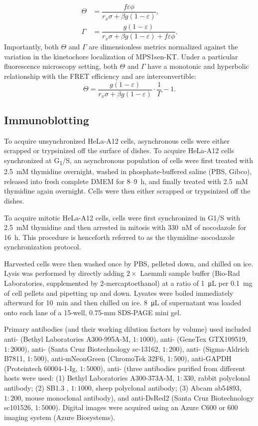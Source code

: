 \begin{align*}
    \Theta &= \dfrac{f\varepsilon\phi}{r_x\sigma + \beta g(1 - \varepsilon)},\\
    \Gamma &= \dfrac{g(1 - \varepsilon)}{r_x\sigma + \beta g(1 - \varepsilon) + f\varepsilon\phi}.
\end{align*}
Importantly, both $\Theta$ and $\Gamma$ are dimensionless metrics normalized against the variation in the kinetochore localization of MPS1sen-KT. Under a particular fluorescence microscopy setting, both $\Theta$ and $\Gamma$ have a monotonic and hyperbolic relationship with the FRET efficiency and are interconvertible:
\begin{equation*}
    \Theta = \dfrac{g(1 - \varepsilon)}{r_x\sigma + \beta g(1 - \varepsilon)}\cdot\dfrac{1}{\Gamma} - 1.
\end{equation*}

\subsection{Immunoblotting}
\label{WBMethods}
To acquire unsynchronized HeLa-A12 cells, asynchronous cells were either scrapped or trypsinized off the surface of dishes. To acquire HeLa-A12 cells synchronized at G\textsubscript{1}/S, an asynchronous population of cells were first treated with \SI{2.5}{mM} thymidine overnight, washed in phosphate-buffered saline (PBS, Gibco), released into fresh complete DMEM for 8--\SI{9}{h}, and finally treated with \SI{2.5}{mM} thymidine again overnight. Cells were then either scrapped or trypsinized off the dishes.

To acquire mitotic HeLa-A12 cells, cells were first synchronized in G1/S with \SI{2.5}{mM} thymidine and then arrested in mitosis with \SI{330}{nM} of nocodazole for \SI{16}{h}. This procedure is henceforth referred to as the thymidine--nocodazole synchronization protocol.

Harvested cells were then washed once by PBS, pelleted down, and chilled on ice. Lysis was performed by directly adding $2 \times$ Laemmli sample buffer (Bio-Rad Laboratories, supplemented by 2-mercaptoethanol) at a ratio of \SI{1}{\micro L} per \SI{0.1}{mg} of cell pellets and pipetting up and down. Lysates were boiled immediately afterward for \SI{10}{min} and then chilled on ice. \SI{8}{\micro L} of supernatant was loaded onto each lane of a 15-well, 0.75-mm SDS-PAGE mini gel.

Primary antibodies (and their working dilution factors by volume) used included anti- (Bethyl Laboratories A300-995A-M, $1 : 1000$), anti- (GeneTex GTX109519, $1 : 2000$), anti- (Santa Cruz Biotechnology sc-13162, $1 : 200$), anti- (Sigma-Aldrich B7811, $1 : 500$), anti-mNeonGreen (ChromoTek 32F6, $1 : 500$), anti-GAPDH (Proteintech 60004-1-Ig, $1 : 5000$), anti- (three antibodies purified from different hosts were used: (1) Bethyl Laboratories A300-373A-M, $1 : 330$, rabbit polyclonal antibody; (2) SB1.3 \cite{SheepAntiBUB1}, $1 : 1000$, sheep polyclonal antibody; (3) Abcam ab54893, $1 : 200$, mouse monoclonal antibody), and anti-DsRed2 (Santa Cruz Biotechnology sc101526, $1 : 5000$). Digital images were acquired using an Azure C600 or 600 imaging system (Azure Biosystems).